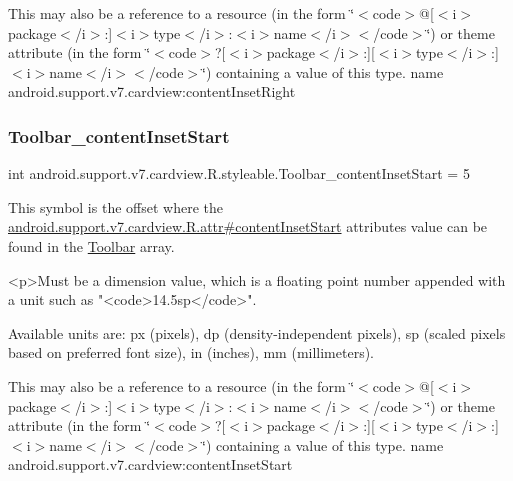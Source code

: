 This may also be a reference to a resource (in the form \char`\"{}$<$code$>$@\mbox{[}$<$i$>$package$<$/i$>$\+:\mbox{]}$<$i$>$type$<$/i$>$\+:$<$i$>$name$<$/i$>$$<$/code$>$\char`\"{}) or theme attribute (in the form \char`\"{}$<$code$>$?\mbox{[}$<$i$>$package$<$/i$>$\+:\mbox{]}\mbox{[}$<$i$>$type$<$/i$>$\+:\mbox{]}$<$i$>$name$<$/i$>$$<$/code$>$\char`\"{}) containing a value of this type.  name android.\+support.\+v7.\+cardview\+:content\+Inset\+Right \mbox{\label{classandroid_1_1support_1_1v7_1_1cardview_1_1R_1_1styleable_ac1839a6fcec9ba5ef65e542846ca28a7}} 
\subsubsection{\texorpdfstring{Toolbar\+\_\+content\+Inset\+Start}{Toolbar\_contentInsetStart}}
{\footnotesize\ttfamily int android.\+support.\+v7.\+cardview.\+R.\+styleable.\+Toolbar\+\_\+content\+Inset\+Start = 5\hspace{0.3cm}{\ttfamily [static]}}

This symbol is the offset where the \hyperlink{classandroid_1_1support_1_1v7_1_1cardview_1_1R_1_1attr_a0fa2d8301062ba60e97d1f8229caa0e1}{android.\+support.\+v7.\+cardview.\+R.\+attr\#content\+Inset\+Start} attribute\textquotesingle{}s value can be found in the \hyperlink{classandroid_1_1support_1_1v7_1_1cardview_1_1R_1_1styleable_a26149aeb8fd339abe09ecc9d92b9304f}{Toolbar} array.

\begin{DoxyVerb}      <p>Must be a dimension value, which is a floating point number appended with a unit such as "<code>14.5sp</code>".
\end{DoxyVerb}
 Available units are\+: px (pixels), dp (density-\/independent pixels), sp (scaled pixels based on preferred font size), in (inches), mm (millimeters). 

This may also be a reference to a resource (in the form \char`\"{}$<$code$>$@\mbox{[}$<$i$>$package$<$/i$>$\+:\mbox{]}$<$i$>$type$<$/i$>$\+:$<$i$>$name$<$/i$>$$<$/code$>$\char`\"{}) or theme attribute (in the form \char`\"{}$<$code$>$?\mbox{[}$<$i$>$package$<$/i$>$\+:\mbox{]}\mbox{[}$<$i$>$type$<$/i$>$\+:\mbox{]}$<$i$>$name$<$/i$>$$<$/code$>$\char`\"{}) containing a value of this type.  name android.\+support.\+v7.\+cardview\+:content\+Inset\+Start \mbox{\label{classandroid_1_1support_1_1v7_1_1cardview_1_1R_1_1styleable_ac5bdebe83f2a68287e8ab3f0ddb5920c}} 
